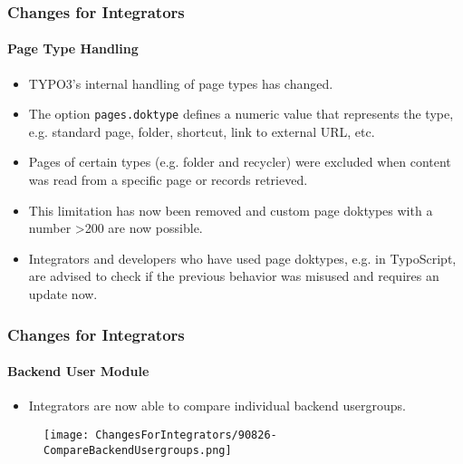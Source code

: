 \begin{frame}[fragile]
	\frametitle{Changes for Integrators}
	\framesubtitle{Page Type Handling}

	\begin{itemize}
		\item TYPO3's internal handling of page types has changed.
		\item The option \texttt{pages.doktype} defines a numeric value that represents the type,
			e.g. standard page, folder, shortcut, link to external URL, etc.
		\item Pages of certain types (e.g. folder and recycler) were excluded when content was
			read from a specific page or records retrieved.
		\item This limitation has now been removed  and custom page doktypes with a number >200
			are now possible.
		\item Integrators and developers who have used page doktypes, e.g. in TypoScript,
			are advised to check if the previous behavior was misused and requires an update now.
	\end{itemize}

\end{frame}


\begin{frame}[fragile]
	\frametitle{Changes for Integrators}
	\framesubtitle{Backend User Module}

	\begin{itemize}
		\item Integrators are now able to compare individual backend usergroups.
	\end{itemize}

	\begin{figure}
		\texttt{[image: ChangesForIntegrators/90826-CompareBackendUsergroups.png]}
	\end{figure}

\end{frame}


